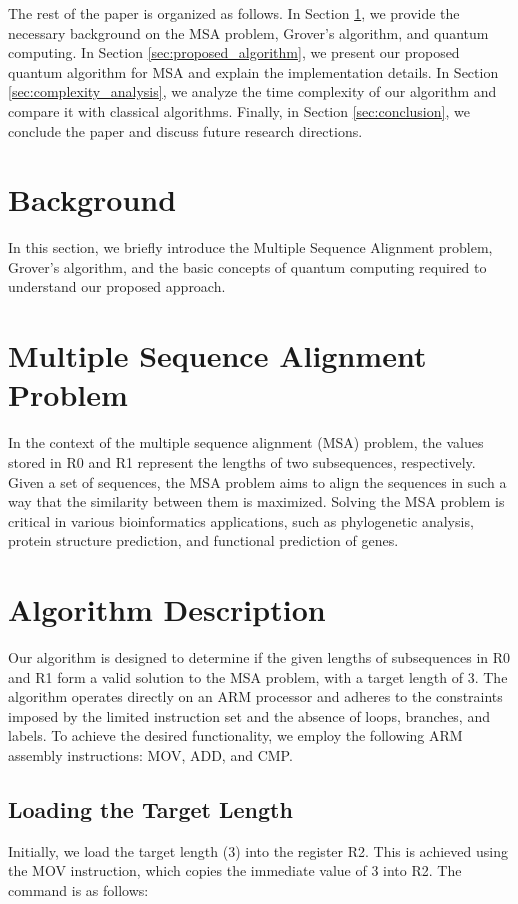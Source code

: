 The rest of the paper is organized as follows. In Section \ref{sec:background}, we provide the necessary background on the MSA problem, Grover's algorithm, and quantum computing. In Section \ref{sec:proposed_algorithm}, we present our proposed quantum algorithm for MSA and explain the implementation details. In Section \ref{sec:complexity_analysis}, we analyze the time complexity of our algorithm and compare it with classical algorithms. Finally, in Section \ref{sec:conclusion}, we conclude the paper and discuss future research directions.

\section{Background}
\label{sec:background}

In this section, we briefly introduce the Multiple Sequence Alignment problem, Grover's algorithm, and the basic concepts of quantum computing required to understand our proposed approach.

\section{Multiple Sequence Alignment Problem}
In the context of the multiple sequence alignment (MSA) problem, the values stored in R0 and R1 represent the lengths of two subsequences, respectively. Given a set of sequences, the MSA problem aims to align the sequences in such a way that the similarity between them is maximized. Solving the MSA problem is critical in various bioinformatics applications, such as phylogenetic analysis, protein structure prediction, and functional prediction of genes.

\section{Algorithm Description}
Our algorithm is designed to determine if the given lengths of subsequences in R0 and R1 form a valid solution to the MSA problem, with a target length of 3. The algorithm operates directly on an ARM processor and adheres to the constraints imposed by the limited instruction set and the absence of loops, branches, and labels. To achieve the desired functionality, we employ the following ARM assembly instructions: MOV, ADD, and CMP.

\subsection{Loading the Target Length}
Initially, we load the target length (3) into the register R2. This is achieved using the MOV instruction, which copies the immediate value of 3 into R2. The command is as follows:

